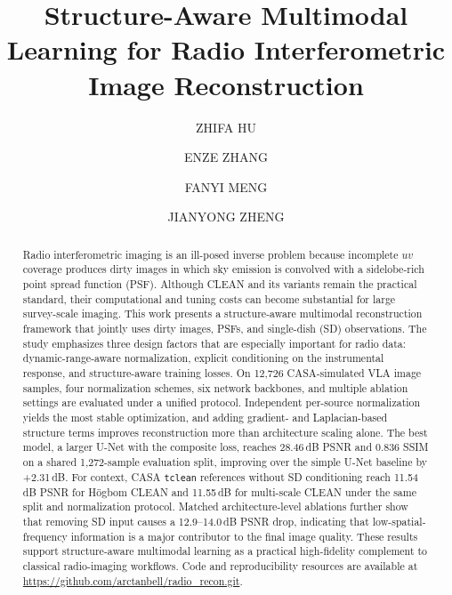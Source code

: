 \documentclass[twocolumn]{aastex631}
\begin{document}
\title{Structure-Aware Multimodal Learning for Radio Interferometric Image Reconstruction}

\author{ZHIFA HU}

\author{ENZE ZHANG}

\author{FANYI MENG}

\author{JIANYONG ZHENG}

\begin{abstract}
	Radio interferometric imaging is an ill-posed inverse problem because incomplete $uv$ coverage produces dirty images in which sky emission is convolved with a sidelobe-rich point spread function (PSF).
	Although CLEAN and its variants remain the practical standard, their computational and tuning costs can become substantial for large survey-scale imaging.
	This work presents a structure-aware multimodal reconstruction framework that jointly uses dirty images, PSFs, and single-dish (SD) observations.
	The study emphasizes three design factors that are especially important for radio data: dynamic-range-aware normalization, explicit conditioning on the instrumental response, and structure-aware training losses.
	On 12,726 CASA-simulated VLA image samples, four normalization schemes, six network backbones, and multiple ablation settings are evaluated under a unified protocol.
	Independent per-source normalization yields the most stable optimization, and adding gradient- and Laplacian-based structure terms improves reconstruction more than architecture scaling alone.
	The best model, a larger U-Net with the composite loss, reaches 28.46\,dB PSNR and 0.836 SSIM on a shared 1,272-sample evaluation split, improving over the simple U-Net baseline by +2.31\,dB.
	For context, CASA \texttt{tclean} references without SD conditioning reach 11.54\,dB PSNR for H{\"o}gbom CLEAN and 11.55\,dB for multi-scale CLEAN under the same split and normalization protocol.
	Matched architecture-level ablations further show that removing SD input causes a 12.9--14.0\,dB PSNR drop, indicating that low-spatial-frequency information is a major contributor to the final image quality.
	These results support structure-aware multimodal learning as a practical high-fidelity complement to classical radio-imaging workflows.
	Code and reproducibility resources are available at \url{https://github.com/arctanbell/radio_recon.git}.
\end{abstract}
\end{document}
